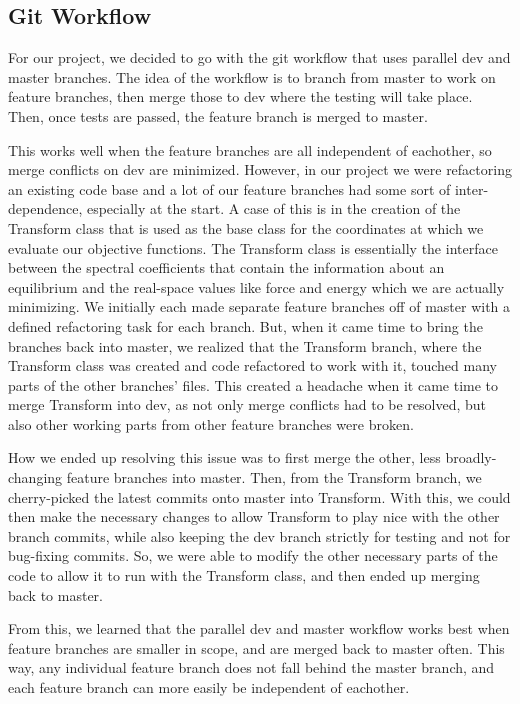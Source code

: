 \documentclass{article}
\begin{document}
\subsection{Git Workflow}

For our project, we decided to go with the git workflow that uses parallel dev and master branches.
The idea of the workflow is to branch from master to work on feature branches, then merge those to dev where the testing will take place.
Then, once tests are passed, the feature branch is merged to master.

This works well when the feature branches are all independent of eachother, so merge conflicts on dev are minimized.
However, in our project we were refactoring an existing code base and a lot of our feature branches had some sort of inter-dependence, especially at the start.
A case of this is in the creation of the Transform class that is used as the base class for the coordinates at which we evaluate our objective functions.
The Transform class is essentially the interface between the spectral coefficients that contain the information about an equilibrium and the real-space values like force and energy which we are actually minimizing.
We initially each made separate feature branches off of master with a defined refactoring task for each branch.
But, when it came time to bring the branches back into master, we realized that the Transform branch, where the Transform class was created and code refactored to work with it, touched many parts of the other branches' files.
This created a headache when it came time to merge Transform into dev, as not only merge conflicts had to be resolved, but also other working parts from other feature branches were broken.

How we ended up resolving this issue was to first merge the other, less broadly-changing feature branches into master.
Then, from the Transform branch, we cherry-picked the latest commits onto master into Transform.
With this, we could then make the necessary changes to allow Transform to play nice with the other branch commits, while also keeping the dev branch strictly for testing and not for bug-fixing commits.
So, we were able to modify the other necessary parts of the code to allow it to run with the Transform class, and then ended up merging back to master.

From this, we learned that the parallel dev and master workflow works best when feature branches are smaller in scope, and are merged back to master often.
This way, any individual feature branch does not fall behind the master branch, and each feature branch can more easily be independent of eachother.
\end{document}
